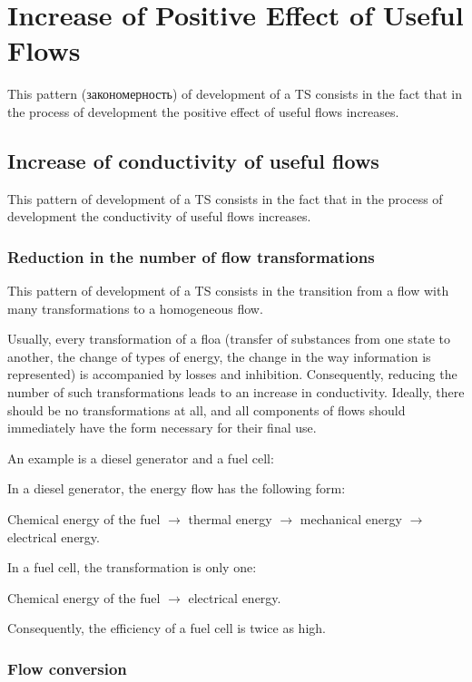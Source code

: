 \documentclass[a4paper,11pt]{article}
\begin{document}
\section{Increase of Positive Effect of Useful Flows}

This pattern (\foreignlanguage{russian}{закономерность}) of development of a
TS consists in the fact that in the process of development the positive effect
of useful flows increases.

\subsection{Increase of conductivity of useful flows}

This pattern of development of a TS consists in the fact that in the process
of development the conductivity of useful flows increases.

\subsubsection{Reduction in the number of flow transformations}

This pattern of development of a TS consists in the transition from a flow
with many transformations to a homogeneous flow.

Usually, every transformation of a floa (transfer of substances from one state
to another, the change of types of energy, the change in the way information
is represented) is accompanied by losses and inhibition.  Consequently,
reducing the number of such transformations leads to an increase in
conductivity.  Ideally, there should be no transformations at all, and all
components of flows should immediately have the form necessary for their final
use.

An example is a diesel generator and a fuel cell:

In a diesel generator, the energy flow has the following form:

Chemical energy of the fuel $\to$ thermal energy $\to$ mechanical energy $\to$
electrical energy.

In a fuel cell, the transformation is only one:

Chemical energy of the fuel $\to$ electrical energy.

Consequently, the efficiency of a fuel cell is twice as high.

\subsubsection{Flow conversion}
\end{document}

